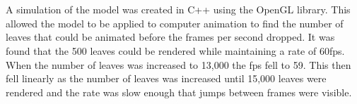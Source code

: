 \\
\\
A simulation of the model was created in C++ using the OpenGL\textsuperscript{\textregistered} library. This allowed the model to be applied to computer animation to find the number of leaves that could be animated before the frames per second dropped. It was found that the 500 leaves could be rendered while maintaining a rate of 60fps. When the number of leaves was increased to 13,000 the fps fell to 59. This then fell linearly as the number of leaves was increased until 15,000 leaves were rendered and the rate was slow enough that jumps between frames were visible.  

